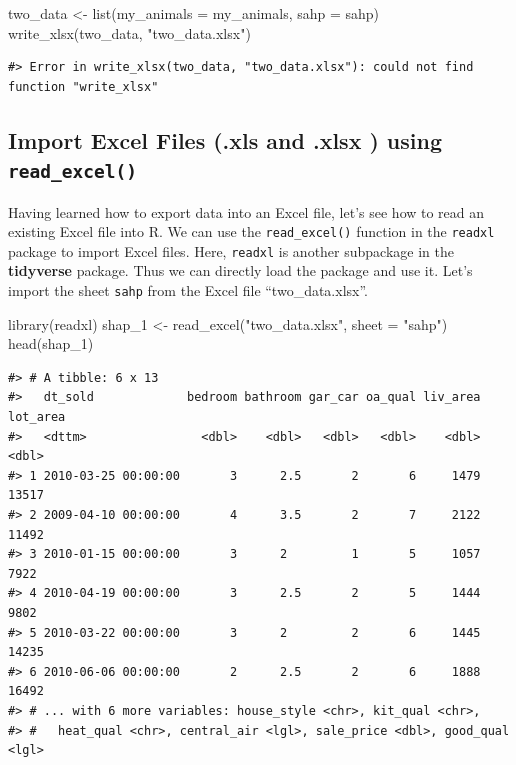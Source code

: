 \documentclass[
]{book}
\newenvironment{Shaded}{\begin{snugshade}}{\end{snugshade}}
\newcommand{\AttributeTok}[1]{\textcolor[rgb]{0.77,0.63,0.00}{#1}}
\newcommand{\FunctionTok}[1]{\textcolor[rgb]{0.00,0.00,0.00}{#1}}
\newcommand{\NormalTok}[1]{#1}
\newcommand{\OtherTok}[1]{\textcolor[rgb]{0.56,0.35,0.01}{#1}}
\newcommand{\StringTok}[1]{\textcolor[rgb]{0.31,0.60,0.02}{#1}}
\begin{document}
\begin{Shaded}
\begin{Highlighting}[]
\NormalTok{two\_data }\OtherTok{\textless{}{-}} \FunctionTok{list}\NormalTok{(}\AttributeTok{my\_animals =}\NormalTok{ my\_animals, }\AttributeTok{sahp =}\NormalTok{ sahp)}
\FunctionTok{write\_xlsx}\NormalTok{(two\_data, }\StringTok{"two\_data.xlsx"}\NormalTok{)}
\end{Highlighting}
\end{Shaded}

\begin{verbatim}
#> Error in write_xlsx(two_data, "two_data.xlsx"): could not find function "write_xlsx"
\end{verbatim}

\hypertarget{import-excel-files-.xls-and-.xlsx-using-read_excel}{%
\subsection{\texorpdfstring{Import Excel Files (.xls and .xlsx ) using \texttt{read\_excel()}}{Import Excel Files (.xls and .xlsx ) using read\_excel()}}\label{import-excel-files-.xls-and-.xlsx-using-read_excel}}

Having learned how to export data into an Excel file, let's see how to read an existing Excel file into R. We can use the \texttt{read\_excel()} function in the \texttt{readxl} package to import Excel files. Here, \texttt{readxl} is another subpackage in the \textbf{tidyverse} package. Thus we can directly load the package and use it.
Let's import the sheet \texttt{sahp} from the Excel file ``two\_data.xlsx''.

\begin{Shaded}
\begin{Highlighting}[]
\FunctionTok{library}\NormalTok{(readxl)}
\NormalTok{shap\_1 }\OtherTok{\textless{}{-}} \FunctionTok{read\_excel}\NormalTok{(}\StringTok{"two\_data.xlsx"}\NormalTok{, }\AttributeTok{sheet =} \StringTok{"sahp"}\NormalTok{)}
\FunctionTok{head}\NormalTok{(shap\_1)}
\end{Highlighting}
\end{Shaded}

\begin{verbatim}
#> # A tibble: 6 x 13
#>   dt_sold             bedroom bathroom gar_car oa_qual liv_area lot_area
#>   <dttm>                <dbl>    <dbl>   <dbl>   <dbl>    <dbl>    <dbl>
#> 1 2010-03-25 00:00:00       3      2.5       2       6     1479    13517
#> 2 2009-04-10 00:00:00       4      3.5       2       7     2122    11492
#> 3 2010-01-15 00:00:00       3      2         1       5     1057     7922
#> 4 2010-04-19 00:00:00       3      2.5       2       5     1444     9802
#> 5 2010-03-22 00:00:00       3      2         2       6     1445    14235
#> 6 2010-06-06 00:00:00       2      2.5       2       6     1888    16492
#> # ... with 6 more variables: house_style <chr>, kit_qual <chr>,
#> #   heat_qual <chr>, central_air <lgl>, sale_price <dbl>, good_qual <lgl>
\end{verbatim}
\end{document}
